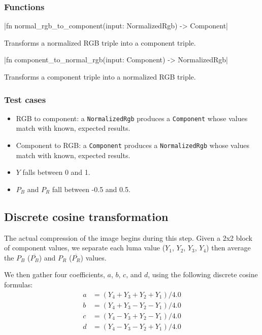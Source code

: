 \documentclass[12pt, letterpaper]{article}
\begin{document}
    \subsubsection{Functions}

    |fn normal_rgb_to_component(input: NormalizedRgb) -> Component|

    Transforms a normalized RGB triple into a component triple.

    |fn component_to_normal_rgb(input: Component) -> NormalizedRgb|

    Transforms a component triple into a normalized RGB triple.

    \subsubsection{Test cases}

    \begin{itemize}
        \item RGB to component: a \verb|NormalizedRgb| produces a
        \verb|Component| whose values match with known, expected results.
        \item Component to RGB: a \verb|Component| produces a
        \verb|NormalizedRgb| whose values match with known, expected results.
        \item $Y$ falls between 0 and 1.
        \item $P_B$ and $P_R$ fall between -0.5 and 0.5.
    \end{itemize}

    \subsection{Discrete cosine transformation}

    The actual compression of the image begins during this step.
    Given a 2x2 block of component values, we separate each luma value ($Y_1$, $Y_2$, $Y_3$, $Y_4$)
    then average the $P_B$ ($\overline{P_B}$) and $P_R$ ($\overline{P_R}$) values.

    We then gather four coefficients, $a$, $b$, $c$, and $d$, using the following discrete cosine formulas:
    \begin{align*}
        a &= (Y_4 + Y_3 + Y_2 + Y_1) / 4.0 \\
        b &= (Y_4 + Y_3 - Y_2 - Y_1) / 4.0 \\
        c &= (Y_4 - Y_3 + Y_2 - Y_1) / 4.0 \\
        d &= (Y_4 - Y_3 - Y_2 + Y_1) / 4.0
    \end{align*}
\end{document}
